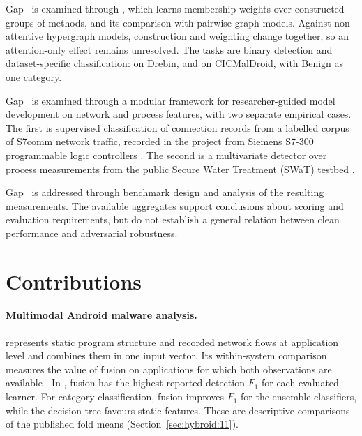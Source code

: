 
Gap~ is examined through \hgann{}, which learns membership weights over constructed
groups of methods, and its comparison with pairwise graph models. Against non-attentive
hypergraph models, construction and weighting change together, so an attention-only effect
remains unresolved. The tasks are binary detection and dataset-specific
classification: \familyclassification{} on Drebin, and \categoryclassification{} on
CICMalDroid, with Benign as one category.


Gap~ is examined through a modular framework for researcher-guided model development
on network and process features, with two separate empirical cases. The first is supervised classification of connection records
from a labelled corpus of S7comm network traffic, recorded in the \iuno{} project from
Siemens S7-300 programmable logic controllers \cite{iuno_ap4}. The second is a multivariate
detector over process measurements from the public Secure Water Treatment (SWaT) testbed
\cite{goh2016swatdataset}.


Gap~ is addressed through benchmark design and analysis of the resulting
measurements. The available aggregates support conclusions about scoring and evaluation
requirements, but do not establish a general relation between clean performance and
adversarial robustness.

\section{Contributions}
\label{sec:intro:contributions}

\paragraph{Multimodal Android malware analysis.}
\hybroid{} represents static program structure and recorded network flows at application
level and combines them in one input vector. Its within-system comparison measures the value of
fusion on applications for which both observations are available \cite{norouzian2021hybroid}. In \hybroid{}, fusion has
the highest reported detection $F_1$ for each evaluated learner. For category classification,
fusion improves $F_1$ for the ensemble classifiers, while the decision tree favours static features.
These are descriptive comparisons of the published fold means
(Section~\ref{sec:hybroid:11}).

